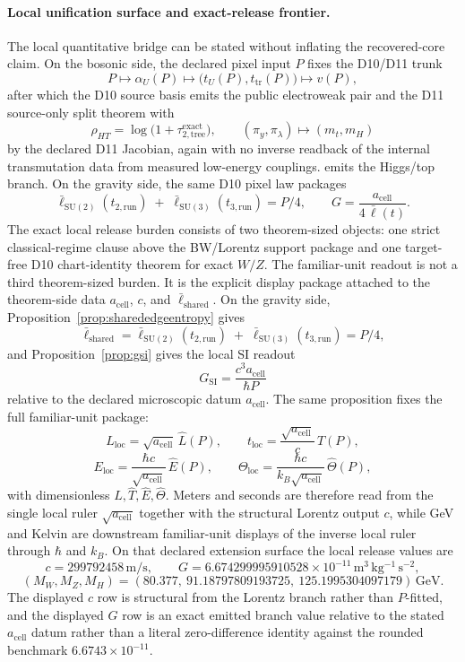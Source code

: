 \documentclass[11pt]{article}
\newcommand{\ellbar}{\bar{\ell}}
\begin{document}
\paragraph{Local unification surface and exact-release frontier.}
The local quantitative bridge can be stated without inflating the recovered-core claim. On the
bosonic side, the declared pixel input \(P\) fixes the D10/D11 trunk
\[
P\longmapsto \alpha_U(P) \longmapsto \bigl(t_U(P),t_{\mathrm{tr}}(P)\bigr)\longmapsto v(P),
\]
after which the D10 source basis emits the public electroweak pair and the D11 source-only split theorem with
\[
\rho_{HT}=\log\!\bigl(1+\tau_{2,\mathrm{tree}}^{\mathrm{exact}}\bigr),
\qquad
(\pi_y,\pi_\lambda)\longmapsto (m_t,m_H)
\]
by the declared D11 Jacobian, again with no inverse readback of the internal transmutation data from measured low-energy couplings.
emits the Higgs/top branch. On the gravity side, the same D10 pixel law packages
\[
\ellbar_{\mathrm{SU(2)}}(t_{2,\mathrm{run}})
\;+\;
\ellbar_{\mathrm{SU(3)}}(t_{3,\mathrm{run}})
=
P/4,
\qquad
G=\frac{a_{\mathrm{cell}}}{4\,\ellbar(t)}.
\]
The exact local release burden consists of two theorem-sized objects: one strict
classical-regime clause above the BW/Lorentz support package and one target-free D10
chart-identity theorem for exact \(W/Z\). The familiar-unit readout is not a third theorem-sized
burden. It is the explicit display package attached to the theorem-side data
\(a_{\mathrm{cell}}\), \(c\), and \(\ellbar_{\mathrm{shared}}\). On the gravity side,
Proposition~\ref{prop:sharededgeentropy} gives
\[
\ellbar_{\mathrm{shared}}
=
\ellbar_{\mathrm{SU(2)}}(t_{2,\mathrm{run}})
\;+\;
\ellbar_{\mathrm{SU(3)}}(t_{3,\mathrm{run}})
=
P/4,
\]
and Proposition~\ref{prop:gsi} gives the local SI readout
\[
G_{\mathrm{SI}}=\frac{c^3 a_{\mathrm{cell}}}{\hbar P}
\]
relative to the declared microscopic datum \(a_{\mathrm{cell}}\).
The same proposition fixes the full familiar-unit package:
\[
L_{\mathrm{loc}}=\sqrt{a_{\mathrm{cell}}}\,\widehat L(P),\qquad
t_{\mathrm{loc}}=\frac{\sqrt{a_{\mathrm{cell}}}}{c}\,\widehat T(P),
\]
\[
E_{\mathrm{loc}}=\frac{\hbar c}{\sqrt{a_{\mathrm{cell}}}}\,\widehat E(P),\qquad
\Theta_{\mathrm{loc}}=\frac{\hbar c}{k_B\sqrt{a_{\mathrm{cell}}}}\,\widehat\Theta(P),
\]
with dimensionless \(\widehat L,\widehat T,\widehat E,\widehat\Theta\). Meters and seconds are
therefore read from the single local ruler \(\sqrt{a_{\mathrm{cell}}}\) together with the
structural Lorentz output \(c\), while GeV and Kelvin are downstream familiar-unit displays of the
inverse local ruler through \(\hbar\) and \(k_B\).
On that declared extension surface the local release values are
\[
c=299792458\,\mathrm{m/s},
\qquad
G=6.674299995910528\times10^{-11}\,\mathrm{m^3\,kg^{-1}\,s^{-2}},
\]
\[
(M_W,M_Z,M_H)=
(80.377,\ 91.18797809193725,\ 125.1995304097179)\,\mathrm{GeV}.
\]
The displayed \(c\) row is structural from the Lorentz branch rather than \(P\)-fitted, and the
displayed \(G\) row is an exact emitted branch value relative to the stated \(a_{\mathrm{cell}}\)
datum rather than a literal zero-difference identity against the rounded benchmark
\(6.6743\times10^{-11}\).
\end{document}
